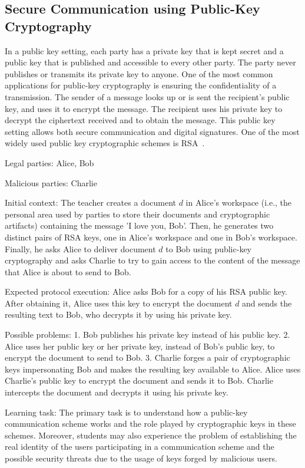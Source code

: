 \documentclass[conference]{IEEEtran}
\begin{document}
\subsection{ Secure Communication using Public-Key Cryptography}

In a public key setting, each party has a private key that is kept
secret and a public key that is published and accessible to every
other party. The party never publishes or transmits its private key to
anyone. One of the most common applications for public-key
cryptography is ensuring the confidentiality of a transmission. The
sender of a message looks up or is sent the recipient's public key,
and uses it to encrypt the message. The recipient uses his private
key to decrypt the ciphertext received and to obtain the message.
This public key setting allows both secure communication and
digital signatures. One of the most widely used public key cryptographic schemes is RSA~\cite{rivest77}.

{\sc Legal parties:} Alice, Bob

{\sc Malicious parties:} Charlie

{\sc Initial context:} The teacher creates a document $d$ in Alice's
workspace (i.e., the personal area used by parties to store their
documents and cryptographic artifacts) containing the message 'I love you, Bob'. Then, he generates
two distinct pairs of RSA keys, one in Alice's workspace and one in
Bob's workspace. Finally, he asks Alice to deliver document $d$
to Bob using public-key cryptography and asks Charlie to try to
gain access to the content of the message that Alice is about to send to Bob.

{\sc Expected protocol execution:} Alice asks Bob for a copy
of his RSA public key. After obtaining it, Alice uses this key
to encrypt the document $d$ and sends the resulting text to Bob, who decrypts it by using his private key.

{\sc Possible problems:} 1. Bob publishes his private key instead of
his public key. 2. Alice uses her public key or her private key,
instead of Bob's public key, to encrypt the document to send to Bob.
3. Charlie forges a pair of cryptographic keys impersonating Bob and
makes the resulting key available to Alice. Alice uses Charlie's
public key to encrypt the document and sends it to Bob. Charlie
intercepts the document and decrypts it using his private key.

{\sc Learning task:} The primary task is to understand how
a public-key communication scheme works and the role played by
cryptographic keys in these schemes. Moreover, students may also
experience the problem of establishing the real identity
of the users participating in a communication scheme and the possible
security threats due to the usage of keys forged by malicious users.
\end{document}
